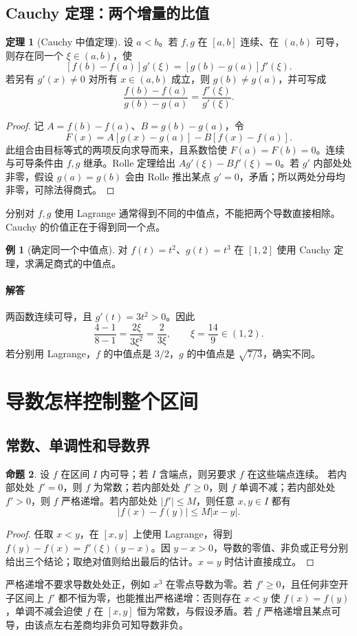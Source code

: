 \documentclass[UTF8,fontset=fandol,12pt,oneside,openany]{ctexrep}
\theoremstyle{definition}
\newtheorem{theorem}{定理}[chapter]
\newtheorem{proposition}[theorem]{命题}
\newtheorem{example}{例}[chapter]
\begin{document}
\subsection{Cauchy 定理：两个增量的比值}
\begin{theorem}[Cauchy 中值定理]\label{lec:06:cauchy}
设 $a<b$。若 $f,g$ 在 $[a,b]$ 连续、在 $(a,b)$ 可导，则存在同一个 $\xi\in(a,b)$，使
\[
[f(b)-f(a)]g'(\xi)=[g(b)-g(a)]f'(\xi).
\]
若另有 $g'(x)\ne0$ 对所有 $x\in(a,b)$ 成立，则 $g(b)\ne g(a)$，并可写成
\[
\frac{f(b)-f(a)}{g(b)-g(a)}=\frac{f'(\xi)}{g'(\xi)}.
\]
\end{theorem}
\begin{proof}
记 $A=f(b)-f(a)$、$B=g(b)-g(a)$，令
\[
F(x)=A[g(x)-g(a)]-B[f(x)-f(a)].
\]
此组合由目标等式的两项反向求导而来，且系数恰使 $F(a)=F(b)=0$。连续与可导条件由 $f,g$ 继承。Rolle 定理给出 $Ag'(\xi)-Bf'(\xi)=0$。若 $g'$ 内部处处非零，假设 $g(a)=g(b)$ 会由 Rolle 推出某点 $g'=0$，矛盾；所以两处分母均非零，可除法得商式。
\end{proof}
分别对 $f,g$ 使用 Lagrange 通常得到不同的中值点，不能把两个导数直接相除。Cauchy 的价值正在于得到同一个点。
\begin{example}[确定同一个中值点]
对 $f(t)=t^2$、$g(t)=t^3$ 在 $[1,2]$ 使用 Cauchy 定理，求满足商式的中值点。
\end{example}
\paragraph{解答}
两函数连续可导，且 $g'(t)=3t^2>0$。因此
\[
\frac{4-1}{8-1}=\frac{2\xi}{3\xi^2}=\frac2{3\xi},
\qquad \xi=\frac{14}{9}\in(1,2).
\]
若分别用 Lagrange，$f$ 的中值点是 $3/2$，$g$ 的中值点是 $\sqrt{7/3}$，确实不同。

\section{导数怎样控制整个区间}
\subsection{常数、单调性和导数界}
\begin{proposition}\label{lec:06:derivative-control}
设 $f$ 在区间 $I$ 内可导；若 $I$ 含端点，则另要求 $f$ 在这些端点连续。
若内部处处 $f'=0$，则 $f$ 为常数；若内部处处 $f'\ge0$，则 $f$ 单调不减；若内部处处 $f'>0$，则 $f$ 严格递增。若内部处处 $|f'|\le M$，则任意 $x,y\in I$ 都有
\[
|f(x)-f(y)|\le M|x-y|.
\]
\end{proposition}
\begin{proof}
任取 $x<y$，在 $[x,y]$ 上使用 Lagrange，得到 $f(y)-f(x)=f'(\xi)(y-x)$。因 $y-x>0$，导数的零值、非负或正号分别给出三个结论；取绝对值则给出最后的估计。$x=y$ 时估计直接成立。
\end{proof}
严格递增不要求导数处处正，例如 $x^3$ 在零点导数为零。若 $f'\ge0$，且任何非空开子区间上 $f'$ 都不恒为零，也能推出严格递增：否则存在 $x<y$ 使 $f(x)=f(y)$，单调不减会迫使 $f$ 在 $[x,y]$ 恒为常数，与假设矛盾。若 $f$ 严格递增且某点可导，由该点左右差商均非负可知导数非负。
\end{document}
